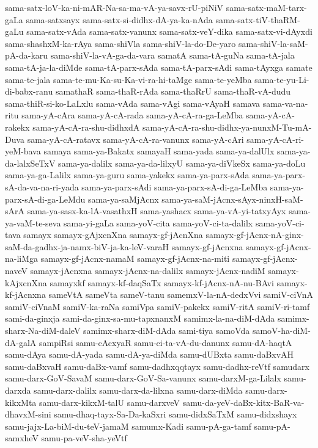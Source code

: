 {sama-satx-loV-ka-ni-mAR-Na-sa-ma-vA-ya-savx-rU-piNiV
sama-satx-maM-tarx-gaLa
sama-satxsayx
sama-satx-si-didhx-dA-ya-ka-nAda
sama-satx-tiV-thaRM-gaLu
sama-satx-vAda
sama-satx-vanunx
sama-satx-veY-dika
sama-satx-vi-dAyxdi
sama-shashxM-ka-rAya
sama-shiVla
sama-shiV-la-do-De-yaro
sama-shiV-la-saM-pA-da-karu
sama-shiV-la-vA-ga-da-vara
samatA
sama-tA-guNa
sama-tA-jala
sama-tA-ja-la-diMde
sama-tA-parx-sAda
sama-tA-parx-sAdi
sama-tAyxga
samate
sama-te-jala
sama-te-mu-Ka-su-Ka-vi-ra-hi-taMge
sama-te-yeMba
sama-te-yu-Li-di-babx-ranu
samathaR
sama-thaR-rAda
sama-thaRrU
sama-thaR-vA-dudu
sama-thiR-si-ko-LaLxlu
sama-vAda
sama-vAgi
sama-vAyaH
samava
sama-va-na-ritu
sama-yA-cAra
sama-yA-cA-rada
sama-yA-cA-ra-ga-LeMba
sama-yA-cA-rakekx
sama-yA-cA-ra-shu-didhxdA
sama-yA-cA-ra-shu-didhx-ya-nunxM-Tu-mA-Duva
sama-yA-cA-ratavx
sama-yA-cA-ra-vanunx
sama-yA-cAri
sama-yA-cA-ri-yeM-bava
samaya
sama-ya-Bakatx
samayaH
sama-yada
sama-ya-dalUlx
sama-ya-da-lalxSeTxV
sama-ya-dalilx
sama-ya-da-lilxyU
sama-ya-diVkeSx
sama-ya-doLu
sama-ya-ga-Lalilx
sama-ya-guru
sama-yakekx
sama-ya-parx-sAda
sama-ya-parx-sA-da-va-na-ri-yada
sama-ya-parx-sAdi
sama-ya-parx-sA-di-ga-LeMba
sama-ya-parx-sA-di-ga-LeMdu
sama-ya-saMjAcnx
sama-ya-saM-jAcnx-sAyx-ninxH-saM-sArA
sama-ya-sasx-ka-lA-vasathxH
sama-yashacx
sama-ya-vA-yi-tatxyAyx
sama-ya-vaM-te-seva
sama-yi-gaLa
sama-yoV-cita
sama-yoV-ci-ta-dalilx
sama-yoV-ci-tava
samayx
samayx-gAjxcnXna
samayx-gf-jAcnXna
samayx-gf-jAcnx-nA-ginx-saM-da-gadhx-ja-namx-biV-ja-ka-leV-varaH
samayx-gf-jAcnxna
samayx-gf-jAcnx-na-liMga
samayx-gf-jAcnx-namaM
samayx-gf-jAcnx-na-miti
samayx-gf-jAcnx-naveV
samayx-jAcnxna
samayx-jAcnx-na-dalilx
samayx-jAcnx-nadiM
samayx-kAjxcnXna
samayxkf
samayx-kf-daqSaTx
samayx-kf-jAcnx-nA-nu-BAvi
samayx-kf-jAcnxna
sameVtA
sameVta
sameV-tanu
samemxV-la-nA-dedxVvi
samiV-ciVnA
samiV-ciVnaM
samiV-ka-raNa
samiVpa
samiV-pakekx
samiV-ritA
samiV-ri-tamf
sami-da-ginxja
sami-da-ginx-sa-mu-tapxnanxM
samimx-la-na-diM-dAda
samimx-sharx-Na-diM-daleV
samimx-sharx-diM-dAda
sami-tiya
samoVda
samoV-ha-diM-dA-galA
sampiRsi
samu-cAcxyaR
samu-ci-ta-vA-du-danunx
samu-dA-haqtA
samu-dAya
samu-dA-yada
samu-dA-ya-diMda
samu-dUBxta
samu-daBxvAH
samu-daBxvaH
samu-daBx-vamf
samu-dadhxqqtayx
samu-dadhx-reVtf
samudarx
samu-darx-GoV-SavaM
samu-darx-GoV-Sa-vanunx
samu-darxM-ga-Lilalx
samu-darxda
samu-darx-dalilx
samu-darx-da-lilxna
samu-darx-diMda
samu-darx-kikxMta
samu-darx-kikxM-talU
samu-darxveV
samu-da-yeV-daBx-kitx-BaR-va-dhavxM-sini
samu-dhaq-tayx-Sa-Da-kaSxri
samu-didxSaTxM
samu-didxshayx
samu-jajx-La-biM-du-teV-jamaM
samumx-Kadi
samu-pA-ga-tamf
samu-pA-samxheV
samu-pa-veV-sha-yeVtf
}
